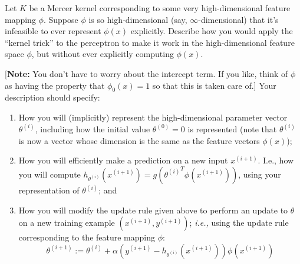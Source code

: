\item Let $K$ be a Mercer kernel corresponding to some
very high-dimensional feature
mapping $\phi$. Suppose $\phi$ is so high-dimensional (say,
$\infty$-dimensional) that it's infeasible to ever represent $\phi(x)$
explicitly.  Describe how you would apply the ``kernel trick'' to the
perceptron to make it work in the high-dimensional feature space $\phi$, but
without ever explicitly computing $\phi(x)$.

[\textbf{Note:} You don't have to worry about the intercept term.  If you like,
think of $\phi$ as having the property that $\phi_0(x) = 1$ so that this is
taken care of.] Your description should specify:
\begin{enumerate}[label=\roman*.]
  \item {} How you will (implicitly) represent the
  high-dimensional
    parameter vector $\theta^{(i)}$, including how the initial value
    $\theta^{(0)} = 0$ is represented (note that $\theta^{(i)}$ is
    now a vector whose dimension is the same as the feature vectors
    $\phi(x)$);
  \item {} How you will efficiently make a prediction on a 
  new input
    $x^{(i+1)}$.  I.e., how you will compute
    $h_{\theta^{(i)}}(x^{(i+1)}) = g({\theta^{(i)}}^T \phi(x^{(i+1)}))$,
    using your representation of $\theta^{(i)}$; and
  \item {} How you will modify the update rule given above 
  to perform an
  update to $\theta$ on a new training example $(x^{(i+1)}, y^{(i+1)})$;
  \emph{i.e.,} using the update rule corresponding to the feature mapping
  $\phi$:
  \begin{equation*}
  \theta^{(i+1)} :=
	  \theta^{(i)} + \alpha (y^{(i+1)} - h_{\theta^{(i)}}(x^{(i+1)})) \phi(x^{(i+1)})
  \end{equation*}
\end{enumerate}
